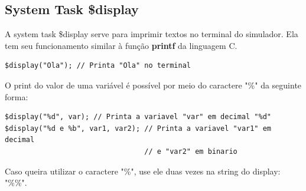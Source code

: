 \documentclass[a4paper]{article}
\begin{document}
\subsection*{System Task \$display}

A system task \$display serve para imprimir textos no terminal do simulador. Ela tem seu funcionamento similar à função \textbf{printf} da linguagem C.
\begin{lstlisting}[style={verilog-style-nolinenumber}]
$display("Ola"); // Printa "Ola" no terminal
\end{lstlisting}

O print do valor de uma variável é possível por meio do caractere "\%" da seguinte forma:
\begin{lstlisting}[style={verilog-style-nolinenumber}]
$display("%d", var); // Printa a variavel "var" em decimal "%d"
$display("%d e %b", var1, var2); // Printa a variavel "var1" em decimal
								 // e "var2" em binario
\end{lstlisting}

Caso queira utilizar o caractere "\%", use ele duas vezes na string do display: "\%\%".


\end{document}
